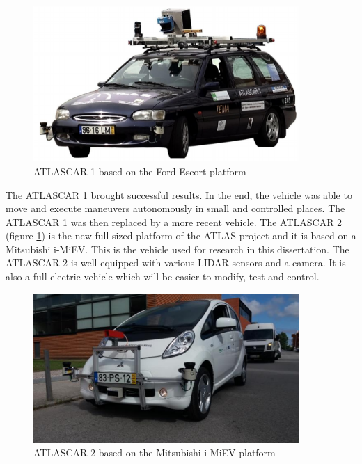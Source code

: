 \begin{figure}[htp]
	
	\centering
	\includegraphics[width=0.9\textwidth]{capintro/imgs/atlascar1}
	
	\caption{ATLASCAR 1 based on the Ford Escort platform}
	\label{fig:atlascar1}
	
\end{figure}

The ATLASCAR 1 brought successful results. In the end, the vehicle was able to move and execute maneuvers autonomously in small and controlled places. The ATLASCAR 1 was then replaced by a more recent vehicle. The ATLASCAR 2 (figure \ref{fig:atlascar1}) is the new full-sized platform of the ATLAS project and it is based on a Mitsubishi i-MiEV. This is the vehicle used for research in this dissertation. The ATLASCAR 2 is well equipped with various LIDAR sensors and a camera. It is also a full electric vehicle which will be easier to modify, test and control. 

\begin{figure}[htp]
	
	\centering
	\includegraphics[width=0.9\textwidth]{capintro/imgs/atlascar2}
	
	\caption{ATLASCAR 2 based on the Mitsubishi i-MiEV platform}
	\label{fig:atlascar2}
	
\end{figure}


